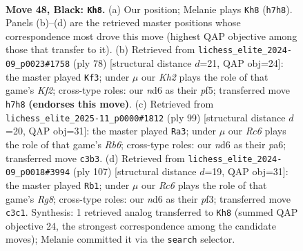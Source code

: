 \documentclass[11pt]{article}
\begin{document}
\clearpage

\begin{figure}[p]\centering
\begin{subfigure}{0.46\textwidth}\centering
\resizebox{\linewidth}{!}{%
\newchessgame
\chessboard[
  setfen={8/6pk/1R1Npp2/7p/1p1P1P1P/2r1P1P1/6K1/8 b - - 5 48},
  showmover=false,
  pgfstyle=straightmove, color=movearrow, markmove={h7-h8}
]}
\caption{}
\end{subfigure}\hfill
\begin{subfigure}{0.46\textwidth}\centering
\resizebox{\linewidth}{!}{%
\newchessgame
\chessboard[
  setfen={8/1p3k2/p1p3p1/2P2pP1/1P2rP1P/3p4/5K2/3R4 w - - 4 40},
  showmover=false,
  pgfstyle=straightmove, color=movearrow, markmove={f2-f3}
]}
\caption{}
\end{subfigure}
\\[4pt]
\begin{subfigure}{0.46\textwidth}\centering
\resizebox{\linewidth}{!}{%
\newchessgame
\chessboard[
  setfen={8/p4pk1/P1R1p2p/6p1/3KP3/1r3P1P/6P1/8 b - - 2 50},
  showmover=false,
  pgfstyle=straightmove, color=movearrow, markmove={b3-a3}
]}
\caption{}
\end{subfigure}\hfill
\begin{subfigure}{0.46\textwidth}\centering
\resizebox{\linewidth}{!}{%
\newchessgame
\chessboard[
  setfen={8/1pp5/p4kp1/P6p/1P5P/2R2PPK/8/6r1 b - - 0 54},
  showmover=false,
  pgfstyle=straightmove, color=movearrow, markmove={g1-b1}
]}
\caption{}
\end{subfigure}
\caption{\textbf{Move 48, Black: \texttt{Kh8}.} (a) Our position; Melanie plays \texttt{Kh8} (\texttt{h7h8}). Panels (b)--(d) are the retrieved master positions whose correspondence most drove this move (highest QAP objective among those that transfer to it). (b) Retrieved from \texttt{lichess\_elite\_2024-09\_p0023\#1758} (ply 78) [structural distance $d$=21, QAP obj=24]: the master played \texttt{Kf3}; under $\mu$ our \emph{Kh2} plays the role of that game's \emph{Kf2}; cross-type roles: our \emph{n}d6 as their \emph{p}f5; transferred move \texttt{h7h8} \textbf{(endorses this move)}. (c) Retrieved from \texttt{lichess\_elite\_2025-11\_p0000\#1812} (ply 99) [structural distance $d$=20, QAP obj=31]: the master played \texttt{Ra3}; under $\mu$ our \emph{Rc6} plays the role of that game's \emph{Rb6}; cross-type roles: our \emph{n}d6 as their \emph{p}a6; transferred move \texttt{c3b3}. (d) Retrieved from \texttt{lichess\_elite\_2024-09\_p0018\#3994} (ply 107) [structural distance $d$=19, QAP obj=31]: the master played \texttt{Rb1}; under $\mu$ our \emph{Rc6} plays the role of that game's \emph{Rg8}; cross-type roles: our \emph{n}d6 as their \emph{p}f3; transferred move \texttt{c3c1}. Synthesis: 1 retrieved analog transferred to \texttt{Kh8} (summed QAP objective 24, the strongest correspondence among the candidate moves); Melanie committed it via the \texttt{search} selector.}
\label{fig:thought-m95}
\end{figure}
\end{document}
